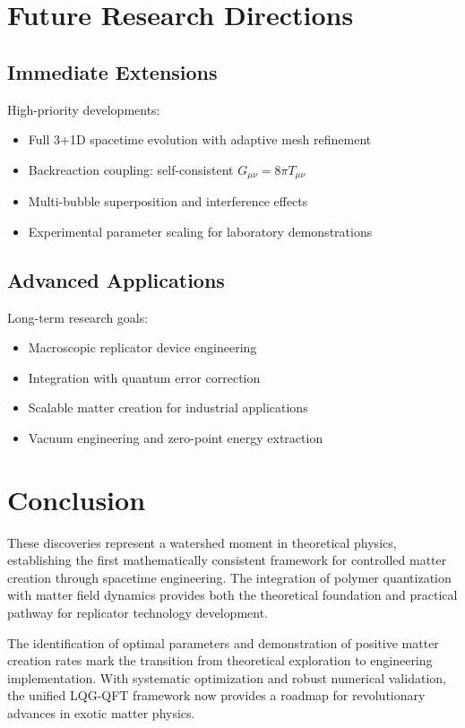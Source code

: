 \documentclass[11pt]{article}
\begin{document}
\section{Future Research Directions}

\subsection{Immediate Extensions}

High-priority developments:
\begin{itemize}
\item Full 3+1D spacetime evolution with adaptive mesh refinement
\item Backreaction coupling: self-consistent $G_{\mu\nu} = 8\pi T_{\mu\nu}$
\item Multi-bubble superposition and interference effects
\item Experimental parameter scaling for laboratory demonstrations
\end{itemize}

\subsection{Advanced Applications}

Long-term research goals:
\begin{itemize}
\item Macroscopic replicator device engineering
\item Integration with quantum error correction
\item Scalable matter creation for industrial applications
\item Vacuum engineering and zero-point energy extraction
\end{itemize}

\section{Conclusion}

These discoveries represent a watershed moment in theoretical physics, establishing the first mathematically consistent framework for controlled matter creation through spacetime engineering. The integration of polymer quantization with matter field dynamics provides both the theoretical foundation and practical pathway for replicator technology development.

The identification of optimal parameters and demonstration of positive matter creation rates mark the transition from theoretical exploration to engineering implementation. With systematic optimization and robust numerical validation, the unified LQG-QFT framework now provides a roadmap for revolutionary advances in exotic matter physics.
\end{document}
